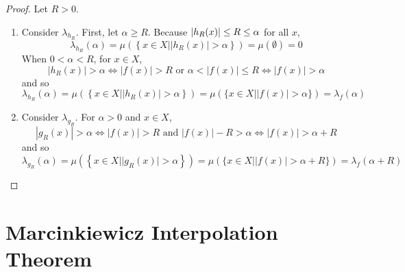 \begin{proof}
	Let $R > 0$.
	\begin{enumerate}[label=(\roman*)]
		\item Consider $\lambda_{h_R}$. First, let $\alpha \geq R$. Because $\left\lvert h_R(x)\right\lvert \leq R \leq \alpha$ for all $x$,
		\begin{equation*}
			\lambda_{h_R}(\alpha)=\mu\left(\left\{x \in X| | h_R(x) \mid>\alpha\right\}\right)=\mu(\emptyset)=0
		\end{equation*}
		When $0 < \alpha < R$, for $x \in X$,
		\begin{equation*}
			\left|h_R(x)\right|>\alpha \Longleftrightarrow |f(x)|>R \text { or } \alpha<|f(x)| \leq R \Longleftrightarrow|f(x)|>\alpha
		\end{equation*}
		and so
		\begin{equation*}
			\lambda_{h_R}(\alpha)=\mu\left(\left\{x \in X| | h_R(x) \mid>\alpha\right\}\right)=\mu(\{x \in X| | f(x) \mid>\alpha\})=\lambda_f(\alpha)
		\end{equation*}

		\item Consider $\lambda_{g_R}$. For $\alpha > 0$ and $x \in X$,
		\begin{equation*}
			\left|g_R(x)\right|>\alpha \Longleftrightarrow |f(x)|>R \text { and }|f(x)|-R>\alpha \Longleftrightarrow|f(x)|>\alpha+R
		\end{equation*}
		and so
		\begin{equation*}
			\lambda_{g_R}(\alpha)=\mu\left(\left\{x \in X| | g_R(x) \mid>\alpha\right\}\right)=\mu(\{x \in X| | f(x) \mid>\alpha+R\})=\lambda_f(\alpha+R)
		\end{equation*}
	\end{enumerate}
\end{proof}

\section{Marcinkiewicz Interpolation Theorem}

